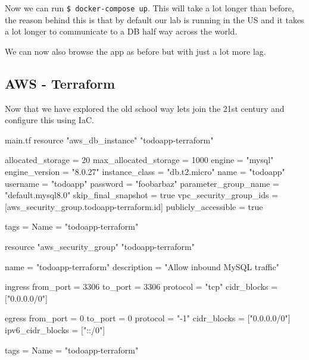 \documentclass{csse4400}
\begin{document}
Now we can run \lstinline[]{$ docker-compose up}.
This will take a lot longer than before,
the reason behind this is that by default our lab is running in the US and it takes a lot longer to communicate to a DB half way across the world.


We can now also browse the app as before but with just a lot more lag.

\subsection{AWS - Terraform}

Now that we have explored the old school way lets join the 21st century and configure this using IaC.

\begin{code}[language=terraform]{main.tf}
resource "aws_db_instance" "todoapp-terraform" {
  allocated_storage      = 20
  max_allocated_storage  = 1000
  engine                 = "mysql"
  engine_version         = "8.0.27"
  instance_class         = "db.t2.micro"
  name                   = "todoapp"
  username               = "todoapp"
  password               = "foobarbaz"
  parameter_group_name   = "default.mysql8.0"
  skip_final_snapshot    = true
  vpc_security_group_ids = [aws_security_group.todoapp-terraform.id]
  publicly_accessible    = true

  tags = {
    Name = "todoapp-terraform"
  }
}

resource "aws_security_group" "todoapp-terraform" {
  name        = "todoapp-terraform"
  description = "Allow inbound MySQL traffic"

  ingress {
    from_port        = 3306
    to_port          = 3306
    protocol         = "tcp"
    cidr_blocks      = ["0.0.0.0/0"]
  }

  egress {
    from_port        = 0
    to_port          = 0
    protocol         = "-1"
    cidr_blocks      = ["0.0.0.0/0"]
    ipv6_cidr_blocks = ["::/0"]
  }

  tags = {
    Name = "todoapp-terraform"
  }
}
\end{code}





\end{document}
